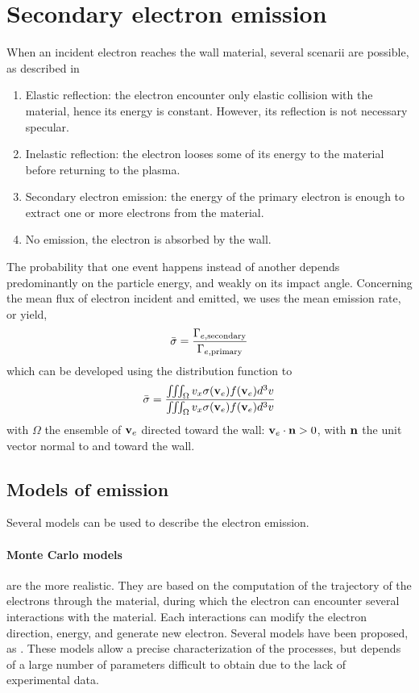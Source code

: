 
\section{Secondary electron emission}
\label{sec-seemodel}
When an incident electron reaches the wall material, several scenarii are possible, as described in \citet{villemant2018}
\begin{enumerate}
  \item Elastic reflection\string: the electron encounter only elastic collision with the material, hence its energy is constant. However, its reflection is not necessary specular.
  \item Inelastic reflection\string: the electron looses some of its energy to the material before returning to the plasma.
  \item Secondary electron emission\string: the energy of the primary electron is enough to extract one or more electrons from the material.
  \item No emission, the electron is absorbed by the wall.
\end{enumerate}

The probability \proba{}  that one event happens instead of another depends predominantly on the particle energy, and weakly on its  impact angle.
Concerning the mean flux of electron incident and emitted, we uses the mean emission rate, or yield, \rate
\begin{equation*} \label{eq-ratedifinition}
   \bar{\sigma } = \frac{\Gamma_{e, \rm secondary}}{\Gamma_{e, \rm primary}}
\end{equation*}
which can be developed using the distribution function to 
\begin{equation*} \label{eq-ratedifinition_evdf}
   \bar{\sigma } = \frac{\iiint_{\Omega} v_x \sigma ({\mathbf v_e}) f({\mathbf v_e}) d^3v}{\iiint_{\Omega} v_x \sigma ({\mathbf v_e}) f({\mathbf v_e}) d^3v}
\end{equation*}
with $\Omega$ the ensemble of ${\mathbf v_e}$ directed toward the wall\string: ${\mathbf v_e} \cdot {\mathbf n} > 0$, with ${\mathbf n} $ the unit vector normal to and toward the wall.

\subsection{Models of emission } \label{subsec-seemodels}
Several models can be used to describe the electron emission.

\paragraph{Monte Carlo models} are the more realistic.
 They are based on the computation of the trajectory of the electrons through the material, during which the electron can encounter several interactions with the material.
 Each interactions can modify the electron direction, energy, and generate new electron.
 Several models have been proposed, as \citet{furman2002,pierron2017}.
 These models allow a precise characterization of the processes, but depends of a large number of parameters difficult to obtain due to the lack of experimental data.
 
